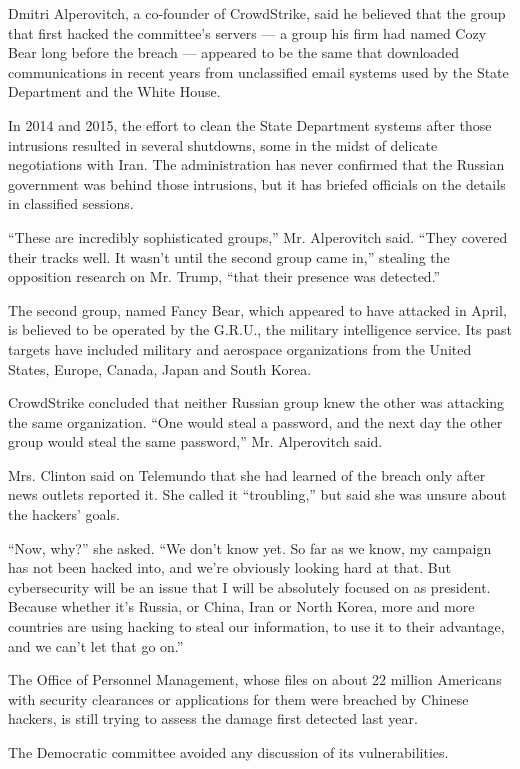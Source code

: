 Dmitri Alperovitch, a co-founder of CrowdStrike, said he believed that
the group that first hacked the committee's servers --- a group his firm
had named Cozy Bear long before the breach --- appeared to be the same
that downloaded communications in recent years from unclassified email
systems used by the State Department and the White House.

In 2014 and 2015, the effort to clean the State Department systems after
those intrusions resulted in several shutdowns, some in the midst of
delicate negotiations with Iran. The administration has never confirmed
that the Russian government was behind those intrusions, but it has
briefed officials on the details in classified sessions.

``These are incredibly sophisticated groups,'' Mr. Alperovitch said.
``They covered their tracks well. It wasn't until the second group came
in,'' stealing the opposition research on Mr. Trump, ``that their
presence was detected.''

The second group, named Fancy Bear, which appeared to have attacked in
April, is believed to be operated by the G.R.U., the military
intelligence service. Its past targets have included military and
aerospace organizations from the United States, Europe, Canada, Japan
and South Korea.

CrowdStrike concluded that neither Russian group knew the other was
attacking the same organization. ``One would steal a password, and the
next day the other group would steal the same password,'' Mr.
Alperovitch said.

Mrs. Clinton said on Telemundo that she had learned of the breach only
after news outlets reported it. She called it ``troubling,'' but said
she was unsure about the hackers' goals.

``Now, why?'' she asked. ``We don't know yet. So far as we know, my
campaign has not been hacked into, and we're obviously looking hard at
that. But cybersecurity will be an issue that I will be absolutely
focused on as president. Because whether it's Russia, or China, Iran or
North Korea, more and more countries are using hacking to steal our
information, to use it to their advantage, and we can't let that go
on.''

The Office of Personnel Management, whose files on about 22 million
Americans with security clearances or applications for them were
breached by Chinese hackers, is still trying to assess the damage first
detected last year.

The Democratic committee avoided any discussion of its vulnerabilities.

